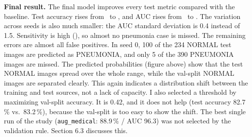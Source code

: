 \documentclass[10pt]{article}
\begin{document}
\textbf{Final result.} The final model improves every test metric compared with the baseline. Test accuracy rises from \baseacc\ to \finalacc, and AUC rises from \baseauc\ to \finalauc.
The variation across seeds is also much smaller: the AUC standard deviation is 0.4 instead of 1.5.
Sensitivity is high (\finalsens), so almost no pneumonia case is missed.
The remaining errors are almost all false positives. In seed 0, 100 of the 234 NORMAL test images are predicted as PNEUMONIA, and only 5 of the 390 PNEUMONIA images are missed.
The predicted probabilities (figure above) show that the test NORMAL images spread over the whole range, while the val-split NORMAL images are separated clearly.
This again indicates a distribution shift between the training and test sources, not a lack of capacity.
I also selected a threshold by maximizing val-split accuracy. It is 0.42, and it does not help (test accuracy 82.7\,\% vs.\ 83.2\,\%), because the val-split is too easy to show the shift.
The best single run of the study (\texttt{aug\_medical}: 88.9\,\% / AUC 96.3) was not selected by the validation rule. Section 6.3 discusses this.
\end{document}
